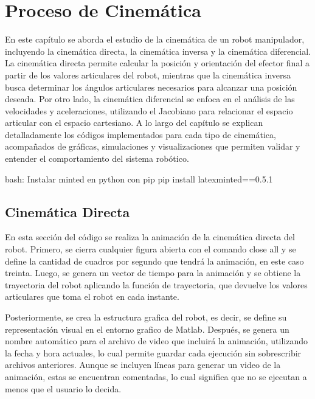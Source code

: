 \section{Proceso de Cinemática} \label{sec:proceso_cinematica}

En este capítulo se aborda el estudio de la cinemática de un robot manipulador, incluyendo la cinemática directa, la cinemática inversa y la cinemática diferencial. La cinemática directa permite calcular la posición y orientación del efector final a partir de los valores articulares del robot, mientras que la cinemática inversa busca determinar los ángulos articulares necesarios para alcanzar una posición deseada. Por otro lado, la cinemática diferencial se enfoca en el análisis de las velocidades y aceleraciones, utilizando el Jacobiano para relacionar el espacio articular con el espacio cartesiano. A lo largo del capítulo se explican detalladamente los códigos implementados para cada tipo de cinemática, acompañados de gráficas, simulaciones y visualizaciones que permiten validar y entender el comportamiento del sistema robótico.

\begin{terminal}{bash: Instalar minted en python con pip}
	pip install latexminted==0.5.1
\end{terminal}

\subsection{Cinemática Directa}

En esta sección del código se realiza la animación de la cinemática directa del robot. Primero, se cierra cualquier figura abierta con el comando close all y se define la cantidad de cuadros por segundo que tendrá la animación, en este caso treinta. Luego, se genera un vector de tiempo para la animación y se obtiene la trayectoria del robot aplicando la función de trayectoria, que devuelve los valores articulares que toma el robot en cada instante. 

Posteriormente, se crea la estructura grafica del robot, es decir, se define su representación visual en el entorno grafico de Matlab. Después, se genera un nombre automático para el archivo de video que incluirá la animación, utilizando la fecha y hora actuales, lo cual permite guardar cada ejecución sin sobrescribir archivos anteriores. Aunque se incluyen líneas para generar un video de la animación, estas se encuentran comentadas, lo cual significa que no se ejecutan a menos que el usuario lo decida. 

